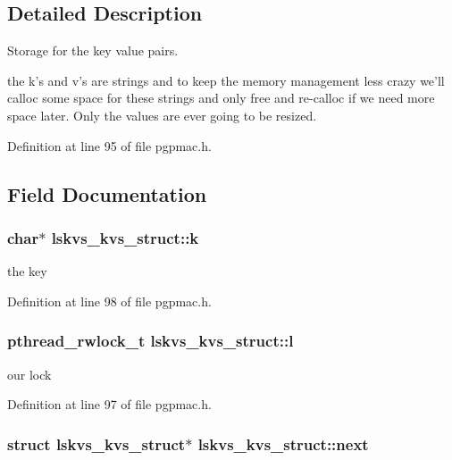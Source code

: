 \subsection{Detailed Description}
Storage for the key value pairs. 

the k's and v's are strings and to keep the memory management less crazy we'll calloc some space for these strings and only free and re-\/calloc if we need more space later. Only the values are ever going to be resized. 

Definition at line 95 of file pgpmac.\-h.



\subsection{Field Documentation}
\hypertarget{structlskvs__kvs__struct_afaaab7729ce9dbabd8f3e2c502a8e4c5}{
\subsubsection[{k}]{\setlength{\rightskip}{0pt plus 5cm}char$\ast$ lskvs\-\_\-kvs\-\_\-struct\-::k}}\label{structlskvs__kvs__struct_afaaab7729ce9dbabd8f3e2c502a8e4c5}


the key 



Definition at line 98 of file pgpmac.\-h.

\hypertarget{structlskvs__kvs__struct_a45129c7f3d0bb2efc83b8a0d7ea2d814}{
\subsubsection[{l}]{\setlength{\rightskip}{0pt plus 5cm}pthread\-\_\-rwlock\-\_\-t lskvs\-\_\-kvs\-\_\-struct\-::l}}\label{structlskvs__kvs__struct_a45129c7f3d0bb2efc83b8a0d7ea2d814}


our lock 



Definition at line 97 of file pgpmac.\-h.

\hypertarget{structlskvs__kvs__struct_a6302f184418962708bd1efe3320d4347}{
\subsubsection[{next}]{\setlength{\rightskip}{0pt plus 5cm}struct {\bf lskvs\-\_\-kvs\-\_\-struct}$\ast$ lskvs\-\_\-kvs\-\_\-struct\-::next}}\label{structlskvs__kvs__struct_a6302f184418962708bd1efe3320d4347}


